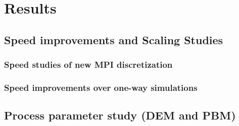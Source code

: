 \documentclass[preprint,11pt,authoryear]{elsarticle}
\begin{document}
\section{Results}

\subsection{Speed improvements and Scaling Studies}

\subsubsection{Speed studies of new MPI discretization}

\subsubsection{Speed improvements over one-way simulations}

\subsection{Process parameter study (DEM and PBM)}
 



%

\end{document}
